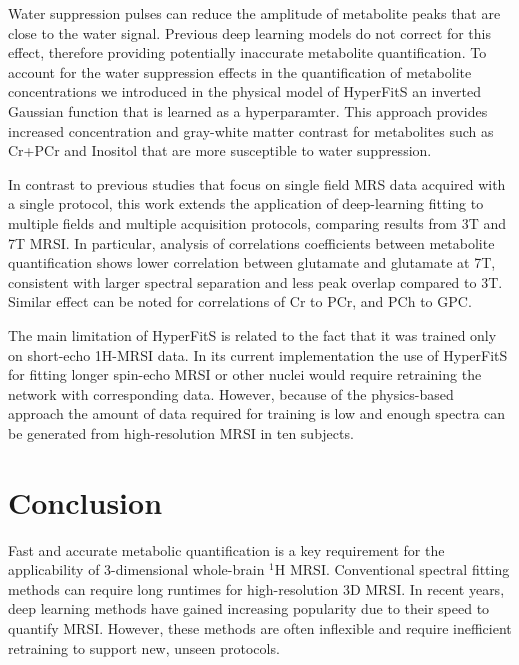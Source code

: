 \documentclass{article}
\begin{document}
    Water suppression pulses can reduce the amplitude of metabolite peaks that are close to the water signal. Previous deep learning models do not correct for this effect, therefore providing potentially inaccurate metabolite quantification. To account for the water suppression effects in the quantification of metabolite concentrations we introduced in the physical model of HyperFitS an inverted Gaussian function that is learned as a hyperparamter. This approach provides increased concentration and gray-white matter contrast for metabolites such as Cr+PCr and Inositol that are more susceptible to water suppression.
    
    
    In contrast to previous studies that focus on single field MRS data acquired with a single protocol, this work extends the application of deep-learning fitting to multiple fields and multiple acquisition protocols, comparing results from 3T and 7T MRSI. In particular, analysis of correlations coefficients between metabolite quantification shows lower correlation between glutamate and glutamate at 7T, consistent with larger spectral separation and less peak overlap compared to 3T. Similar effect can be noted for correlations of Cr to PCr, and PCh to GPC. 

    The main limitation of HyperFitS is related to the fact that it was trained only on short-echo 1H-MRSI data. In its current implementation the use of HyperFitS for fitting longer spin-echo MRSI or other nuclei would require retraining the network with corresponding data. However, because of the physics-based approach the amount of data required for training is low and enough spectra can be generated from high-resolution MRSI in ten subjects.  


\section{Conclusion}
    Fast and accurate metabolic quantification is a key requirement for the applicability of 3-dimensional whole-brain $^1$H MRSI. Conventional spectral fitting methods can require long runtimes for high-resolution 3D MRSI. In recent years, deep learning methods have gained increasing popularity due to their speed to quantify MRSI. However, these methods are often inflexible and require inefficient retraining to support new, unseen protocols. 
   
\end{document}

